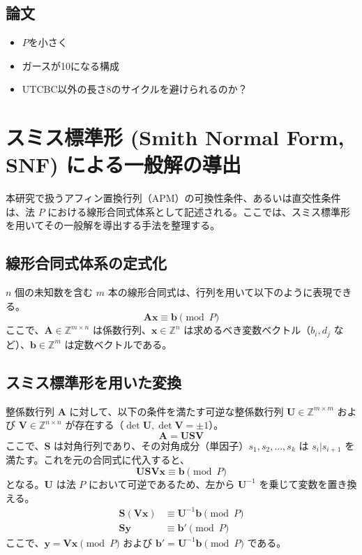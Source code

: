 \documentclass[a4paper,11pt,dvipdfmx]{jsarticle}
\theoremstyle{definition}
\begin{document}
\subsection{論文}
\begin{itemize}
  \item $P$を小さく
  \item ガースが10になる構成
  \item UTCBC以外の長さ8のサイクルを避けられるのか？
\end{itemize}


\section{スミス標準形 (Smith Normal Form, SNF) による一般解の導出}

本研究で扱うアフィン置換行列（APM）の可換性条件、あるいは直交性条件は、法 $P$ における線形合同式体系として記述される。ここでは、スミス標準形を用いてその一般解を導出する手法を整理する。

\subsection{線形合同式体系の定式化}
$n$ 個の未知数を含む $m$ 本の線形合同式は、行列を用いて以下のように表現できる。
\begin{equation}
    \mathbf{A}\mathbf{x} \equiv \mathbf{b} \pmod{P}
\end{equation}
ここで、$\mathbf{A} \in \mathbb{Z}^{m \times n}$ は係数行列、$\mathbf{x} \in \mathbb{Z}^n$ は求めるべき変数ベクトル（$b_i, d_j$ など）、$\mathbf{b} \in \mathbb{Z}^m$ は定数ベクトルである。

\subsection{スミス標準形を用いた変換}
整係数行列 $\mathbf{A}$ に対して、以下の条件を満たす可逆な整係数行列 $\mathbf{U} \in \mathbb{Z}^{m \times m}$ および $\mathbf{V} \in \mathbb{Z}^{n \times n}$ が存在する（$\det \mathbf{U}, \det \mathbf{V} = \pm 1$）。
\begin{equation}
    \mathbf{A} = \mathbf{U} \mathbf{S} \mathbf{V}
\end{equation}
ここで、$\mathbf{S}$ は対角行列であり、その対角成分（単因子）$s_1, s_2, \dots, s_k$ は $s_i | s_{i+1}$ を満たす。これを元の合同式に代入すると、
\begin{equation}
    \mathbf{U} \mathbf{S} \mathbf{V} \mathbf{x} \equiv \mathbf{b} \pmod{P}
\end{equation}
となる。$\mathbf{U}$ は法 $P$ において可逆であるため、左から $\mathbf{U}^{-1}$ を乗じて変数を置き換える。
\begin{align}
    \mathbf{S} (\mathbf{V} \mathbf{x}) &\equiv \mathbf{U}^{-1} \mathbf{b} \pmod{P} \\
    \mathbf{S} \mathbf{y} &\equiv \mathbf{b}' \pmod{P}
\end{align}
ここで、$\mathbf{y} = \mathbf{V} \mathbf{x} \pmod{P}$ および $\mathbf{b}' = \mathbf{U}^{-1} \mathbf{b} \pmod{P}$ である。
\end{document}
